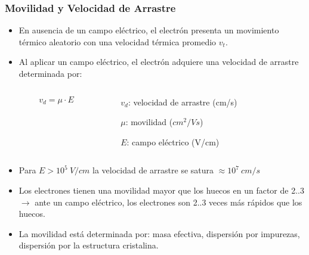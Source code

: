 \documentclass[10pt,t,aspectratio=169]{beamer}
\begin{document}
\begin{frame}[t]
    \frametitle{Movilidad y Velocidad de Arrastre}

    \begin{itemize}
        \item En ausencia de un campo eléctrico, el electrón presenta un movimiento térmico aleatorio con una velocidad térmica promedio $v_t$.
        \item Al aplicar un campo eléctrico, el electrón adquiere una velocidad de arrastre determinada por:
    \end{itemize}
    
    \begin{columns}
    
        \begin{column}{0.5\textwidth}
        
            \[ v_d = \mu{}\cdot{}E \]
            
        \end{column}
        
        \begin{column}{0.5\textwidth}
        
            $v_d$: velocidad de arrastre (cm/s)
            
            $\mu$: movilidad ($cm^2/Vs$)
            
            $E$: campo eléctrico (V/cm)
            
        \end{column}

        
    \end{columns}
    \vspace{5mm}
    \begin{itemize}
        \item Para $E>10^5\ V/cm$ la velocidad de arrastre se satura $\approx{}10^7\ cm/s$
        \item Los electrones tienen una movilidad mayor que los huecos en un factor de 2..3 $\rightarrow$ ante un campo eléctrico, los electrones son 2..3 veces más rápidos que los huecos.
        \item La movilidad está determinada por: masa efectiva, dispersión por impurezas, dispersión por la estructura cristalina.
    \end{itemize}
\end{frame}
\end{document}
